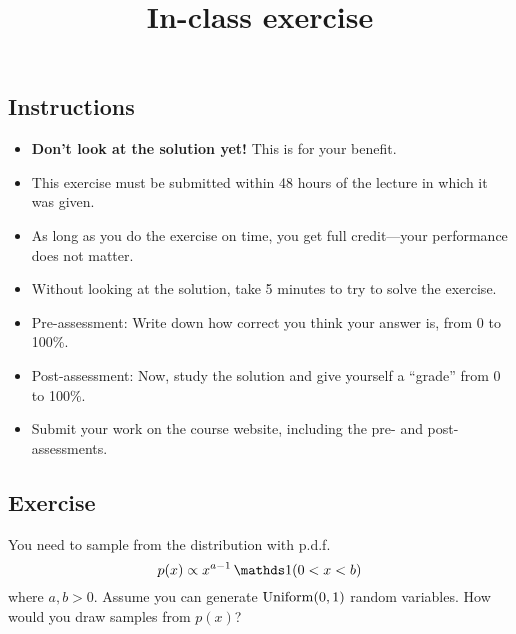 \documentclass[12pt]{article}
\title{In-class exercise}
\author{}
\date{}
\begin{document}
\maketitle

\subsection*{Instructions}
\begin{itemize}
\item \textbf{Don't look at the solution yet!} This is for your benefit.
\item This exercise must be submitted within 48 hours of the lecture in which it was given. 
\item As long as you do the exercise on time, you get full credit---your performance does not matter.
\item Without looking at the solution, take 5 minutes to try to solve the exercise.
\item Pre-assessment: Write down how correct you think your answer is, from 0 to 100\%.
\item Post-assessment: Now, study the solution and give yourself a ``grade'' from 0 to 100\%.
\item Submit your work on the course website, including the pre- and post- assessments.
\end{itemize}

\subsection*{Exercise}
You need to sample from the distribution with p.d.f.\ 
$$p(x) \propto x^{a-1}\,\I(0<x<b)$$
where $a,b>0$.
Assume you can generate $\operatorname*{Uniform}(0,1)$ random variables. 
How would you draw samples from $p(x)$?
\end{document}
